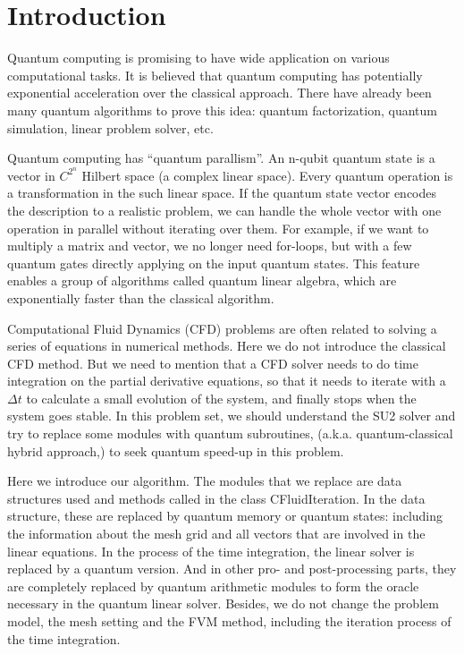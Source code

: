\documentclass[%
 reprint,
 amsmath,amssymb,
pra,
]{revtex4-1}
\begin{document}


\section{Introduction}
Quantum computing is promising to have wide application on various computational tasks. It is believed that quantum computing has potentially exponential acceleration over the classical approach. There have already been many quantum algorithms to prove this idea: quantum factorization, quantum simulation, linear problem solver, etc. 

Quantum computing has “quantum parallism”. An n-qubit quantum state is a vector in $C^{2^n}$ Hilbert space (a complex linear space). Every quantum operation is a transformation in the such linear space. If the quantum state vector encodes the description to a realistic problem, we can handle the whole vector with one operation in parallel without iterating over them. For example, if we want to multiply a matrix and vector, we no longer need for-loops, but with a few quantum gates directly applying on the input quantum states. This feature enables a group of algorithms called quantum linear algebra, which are exponentially faster than the classical algorithm.

Computational Fluid Dynamics (CFD) problems are often related to solving a series of equations in numerical methods. Here we do not introduce the classical CFD method. But we need to mention that a CFD solver needs to do time integration on the partial derivative equations, so that it needs to iterate with a $\Delta t$ to calculate a small evolution of the system, and finally stops when the system goes stable. In this problem set, we should understand the SU2 solver and try to replace some modules with quantum subroutines, (a.k.a. quantum-classical hybrid approach,) to seek quantum speed-up in this problem.

Here we introduce our algorithm. The modules that we replace are data structures used and methods called in the class CFluidIteration. In the data structure, these are replaced by quantum memory or quantum states: including the information about the mesh grid and all vectors that are involved in the linear equations. In the process of the time integration, the linear solver is replaced by a quantum version. And in other pro- and post-processing parts, they are completely replaced by quantum arithmetic modules to form the oracle necessary in the quantum linear solver. Besides, we do not change the problem model, the mesh setting and the FVM method, including the iteration process of the time integration. 
\end{document}

